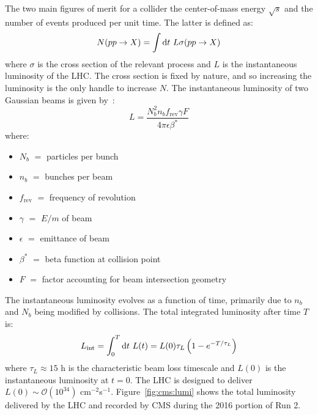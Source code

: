 The two main figures of merit for a collider the center-of-mass energy $\sqrt{s}$ and the number of events produced per unit time.
The latter is defined as:
\begin{equation} 
    N(pp\rightarrow X) = \int \mathrm{d} t~ L \sigma(pp\rightarrow X)
\end{equation}
where $\sigma$ is the cross section of the relevant process and $L$ is the instantaneous luminosity of the LHC. 
The cross section is fixed by nature, and so increasing the luminosity is the only handle to increase $N$. 
The instantaneous luminosity of two Gaussian beams is given by~\cite{lhcjinst}:
\begin{equation}
    L = \frac{N_b^2 n_b f_\mathrm{rev} \gamma F}{4\pi\epsilon \beta^*}
\end{equation}
where:
\begin{itemize}
    \setlength\itemsep{1pt}
    \item $N_b$ $=$ particles per bunch
    \item $n_b$ $=$ bunches per beam 
    \item $f_\mathrm{rev}$ $=$ frequency of revolution 
    \item $\gamma$ $=$ $E/m$ of beam 
    \item $\epsilon$ $=$ emittance of beam 
    \item $\beta^*$ $=$ beta function at collision point 
    \item $F$ $=$ factor accounting for beam intersection geometry
\end{itemize}
The instantaneous luminosity evolves as a function of time, primarily due to $n_b$ and $N_b$ being modified by collisions.
The total integrated luminosity after time $T$ is:
\begin{equation}
    L_\mathrm{int} = \int_0^T \mathrm{d} t~ L(t) = L(0) \tau_L \left(1 - e^{-T/\tau_L}\right)
\end{equation}
where $\tau_L \approx 15$ h is the characteristic beam loss timescale and $L(0)$ is the instantaneous luminosity at $t=0$.
The LHC is designed to deliver $L(0) \sim \mathcal{O}(10^{34})$ cm$^{-2}$s$^{-1}$. 
Figure~\ref{fig:cms:lumi} shows the total luminosity delivered by the LHC and recorded by CMS during the 2016 portion of Run 2. 

